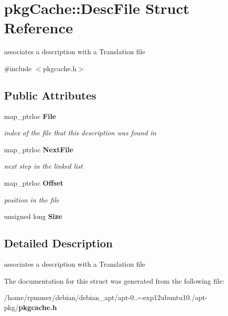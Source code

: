 \section{pkg\-Cache\-:\-:\-Desc\-File \-Struct \-Reference}
\label{structpkgCache_1_1DescFile}


associates a description with a \-Translation file  




{\ttfamily \#include $<$pkgcache.\-h$>$}

\subsection*{\-Public \-Attributes}
\begin{DoxyCompactItemize}
\item 
map\-\_\-ptrloc {\bf \-File}\label{structpkgCache_1_1DescFile_af4599f7ab1abead5702621b8dd500703}

\begin{DoxyCompactList}\small\item\em index of the file that this description was found in \end{DoxyCompactList}\item 
map\-\_\-ptrloc {\bf \-Next\-File}\label{structpkgCache_1_1DescFile_a834318688de732bfd0e8c1a1e79c44be}

\begin{DoxyCompactList}\small\item\em next step in the linked list \end{DoxyCompactList}\item 
map\-\_\-ptrloc {\bf \-Offset}\label{structpkgCache_1_1DescFile_a21e5509b4e50fdbcd32f0907f6006b32}

\begin{DoxyCompactList}\small\item\em position in the file \end{DoxyCompactList}\item 
unsigned long {\bfseries \-Size}\label{structpkgCache_1_1DescFile_adc25a45dd4fc0985b33c968068f749c4}

\end{DoxyCompactItemize}


\subsection{\-Detailed \-Description}
associates a description with a \-Translation file 

\-The documentation for this struct was generated from the following file\-:\begin{DoxyCompactItemize}
\item 
/home/rpmuser/debian/debian\-\_\-apt/apt-\/0..$\sim$exp12ubuntu10./apt-\/pkg/{\bf pkgcache.\-h}\end{DoxyCompactItemize}
